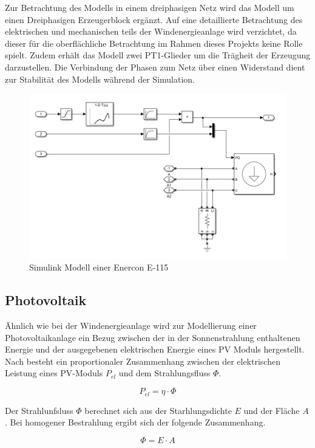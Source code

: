 Zur Betrachtung des Modells in einem dreiphasigen Netz wird das Modell um einen Dreiphasigen Erzeugerblock ergänzt. Auf eine detaillierte Betrachtung des elektrischen und mechanischen teils der Windenergieanlage wird verzichtet, da dieser für die oberflächliche Betrachtung im Rahmen dieses Projekts keine Rolle spielt. Zudem erhält das Modell zwei PT1-Glieder um die Trägheit der Erzeugung darzustellen. Die Verbindung der Phasen zum Netz über einen Widerstand dient zur Stabilität des Modells während der Simulation.

\begin{figure}[H]
	\centering
	\includegraphics[width=0.9\linewidth]{Abbildungen/ModellWEA.png}
	\caption{Simulink Modell einer Enercon E-115}
	\label{fig:e115}
\end{figure}

\subsection{Photovoltaik}
Ähnlich wie bei der Windenergieanlage wird zur Modellierung einer Photovoltaikanlage ein Bezug zwischen der in der Sonnenstrahlung enthaltenen Energie und der ausgegebenen elektrischen Energie eines PV Moduls hergestellt. Nach \cite{PV} besteht ein proportionaler Zusammenhang zwischen der elektrischen Leistung eines PV-Moduls $P_{el}$ und dem Strahlungsfluss $\Phi$. 

\begin{equation}
	P_{el} = \eta \cdot \Phi
\end{equation}

Der Strahlunfsluss $\Phi$ berechnet sich aus der Starhlungsdichte $E$ und der Fläche $A$. Bei homogener Bestrahlung ergibt sich der folgende Zusammenhang.

\begin{equation}
	\Phi = E \cdot A
\end{equation}

